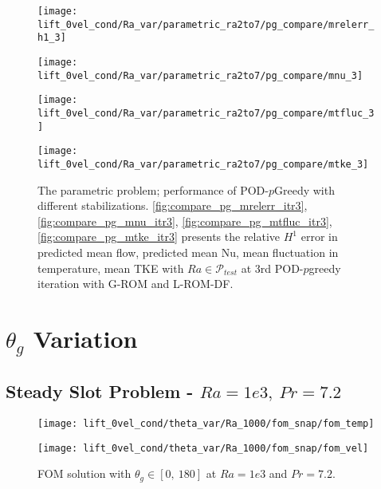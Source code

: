 \begin{figure}[h!]
    \begin{minipage}[b]{.25\linewidth}
        \centering \texttt{[image: lift\_0vel\_cond/Ra\_var/parametric\_ra2to7/pg\_compare/mrelerr\_h1\_3]}
        \label{fig:compare_pg_mrelerr_itr3}
    \end{minipage}%
    \begin{minipage}[b]{.25\linewidth}
        \centering \texttt{[image: lift\_0vel\_cond/Ra\_var/parametric\_ra2to7/pg\_compare/mnu\_3]}
        \label{fig:compare_pg_mnu_itr3}
    \end{minipage}
    \begin{minipage}[b]{.25\linewidth}
        \centering \texttt{[image: lift\_0vel\_cond/Ra\_var/parametric\_ra2to7/pg\_compare/mtfluc\_3]}
        \label{fig:compare_pg_mtfluc_itr3}
    \end{minipage}%
    \begin{minipage}[b]{.25\linewidth}
        \centering \texttt{[image: lift\_0vel\_cond/Ra\_var/parametric\_ra2to7/pg\_compare/mtke\_3]}
        \label{fig:compare_pg_mtke_itr3}
    \end{minipage} \caption{The parametric problem; performance of
    POD-$p$Greedy with different stabilizations.
    \ref{fig:compare_pg_mrelerr_itr3}, \ref{fig:compare_pg_mnu_itr3},
    \ref{fig:compare_pg_mtfluc_itr3}, \ref{fig:compare_pg_mtke_itr3} presents
    the relative $H^1$ error in predicted mean flow, predicted mean Nu, mean
    fluctuation in temperature, mean TKE with $Ra \in \mathcal{P}_{test}$ at
    3rd POD-$p$greedy iteration with G-ROM and L-ROM-DF.}
    \label{fig:compare_pg_3rd} \end{figure}
\clearpage

\section{$\theta_g$ Variation}
\subsection{Steady Slot Problem - $Ra=1e3,~Pr=7.2$}
\begin{figure}[h!]
    \begin{minipage}[b]{.5\linewidth}
   \centering 
   \texttt{[image: lift\_0vel\_cond/theta\_var/Ra\_1000/fom\_snap/fom\_temp]}
    \end{minipage}%
    \begin{minipage}[b]{.5\linewidth}
   \texttt{[image: lift\_0vel\_cond/theta\_var/Ra\_1000/fom\_snap/fom\_vel]}
    \end{minipage}%
   \caption{FOM solution with $\theta_g \in [0,~180]$ at $Ra=1e3$ and $Pr=7.2$.}
\label{fig:slot_pr_7.2_fom_sol} \end{figure}

